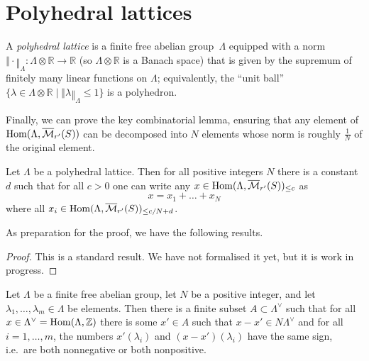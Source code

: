 \section{Polyhedral lattices}

\begin{definition}
  \label{polyhedral_lattice}
  A \emph{polyhedral lattice} is a finite free abelian group~$\Lambda$
  equipped with a norm $‖\cdot‖_\Lambda \colon \Lambda\otimes \mathbb R\to \mathbb R$
  (so $\Lambda\otimes \mathbb R$ is a Banach space)
  that is given by the supremum of finitely many linear functions on $\Lambda$;
  equivalently, the ``unit ball''
  $\{\lambda\in \Lambda\otimes \mathbb R\mid ‖\lambda‖_\Lambda\leq 1\}$ is a polyhedron.
\end{definition}

Finally, we can prove the key combinatorial lemma,
ensuring that any element of $\operatorname{Hom}(\Lambda,\overline{\mathcal M}_{r'}(S))$
can be decomposed into $N$ elements whose norm is roughly $\tfrac 1N$ of the original element.

\begin{lemma}
  \label{combi}
  \leanok
  Let $\Lambda$ be a polyhedral lattice.
  Then for all positive integers $N$ there is a constant $d$
  such that for all $c>0$ one can write any
  $x\in \operatorname{Hom}(\Lambda,\overline{\mathcal M}_{r'}(S))_{\leq c}$ as
  \[
    x=x_1+\ldots+x_N
  \]
  where all $x_i\in \operatorname{Hom}(\Lambda,\overline{\mathcal M}_{r'}(S))_{\leq c/N+d}$.
\end{lemma}

As preparation for the proof, we have the following results.


\begin{proof}
  This is a standard result.
  We have not formalised it yet, but it is work in progress.
\end{proof}

\begin{lemma}
  \label{combi_aux}
  \leanok
  Let $\Lambda$ be a finite free abelian group,
  let $N$ be a positive integer,
  and let $\lambda_1,\ldots,\lambda_m\in \Lambda$ be elements.
  Then there is a finite subset $A\subset \Lambda^\vee$
  such that for all $x\in \Lambda^\vee=\operatorname{Hom}(\Lambda,\mathbb Z)$
  there is some $x'\in A$ such that $x-x'\in N\Lambda^\vee$
  and for all $i=1,\ldots,m$,
  the numbers $x'(\lambda_i)$ and $(x-x')(\lambda_i)$ have the same sign,
  i.e.~are both nonnegative or both nonpositive.
\end{lemma}

